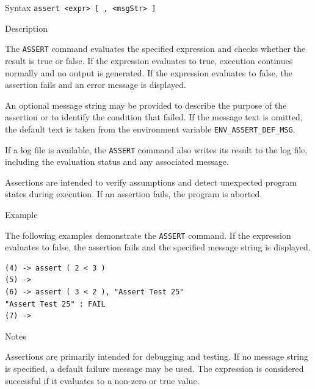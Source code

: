 %
%
\pagebreak
{}

\begin{iPageDescEntry}{Syntax}
\texttt{assert  <expr>  [ , <msgStr> ]}
\end{iPageDescEntry}

\begin{iPageDescEntry}{Description}

The \texttt{ASSERT} command evaluates the specified expression and checks whether the result is true or false. If the expression evaluates to true, execution continues normally and no output is generated. If the expression evaluates to false, the assertion fails and an error message is displayed.

An optional message string may be provided to describe the purpose of the assertion or to identify the condition that failed. If the message text is omitted, the default text is taken from the environment variable \texttt{ENV\_ASSERT\_DEF\_MSG}.

If a log file is available, the \texttt{ASSERT} command also writes its result to the log file, including the evaluation status and any associated message.

Assertions are intended to verify assumptions and detect unexpected program states during execution. If an assertion fails, the program is aborted.

\end{iPageDescEntry}

\begin{iPageDescEntry}{Example}

The following examples demonstrate the \texttt{ASSERT} command. If the expression evaluates to false, the assertion fails and the specified message string is displayed.

\begin{lstlisting}[style=iPageOpStyle]
(4) -> assert ( 2 < 3 )
(5) ->
(6) -> assert ( 3 < 2 ), "Assert Test 25"
"Assert Test 25" : FAIL
(7) ->
\end{lstlisting}
\end{iPageDescEntry}

\begin{iPageDescEntry}{Notes}

Assertions are primarily intended for debugging and testing. If no message string is specified, a default failure message may be used. The expression is considered successful if it evaluates to a non-zero or true value.

\end{iPageDescEntry}